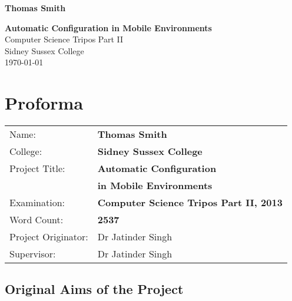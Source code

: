 \documentclass[12pt,twoside,notitlepage]{report}
\begin{document}





\pagestyle{empty}

\hfill{\LARGE \bf Thomas Smith}

\vspace*{60mm}
\begin{center}
\Huge
{\bf Automatic Configuration in Mobile Environments} \\
\vspace*{5mm}
Computer Science Tripos Part II \\
\vspace*{5mm}
Sidney Sussex College \\
\vspace*{5mm}
\today  %
\end{center}

\cleardoublepage


\setcounter{page}{1}
\pagestyle{plain}

\chapter*{Proforma}

{\large
\begin{tabular}{ll}
Name:               & \bf Thomas Smith	\\
College:            & \bf Sidney Sussex College	\\
Project Title:      & \bf Automatic Configuration \\ &\bf in Mobile Environments	\\
Examination:        & \bf Computer Science Tripos Part II, 2013 	\\
Word Count:         & \bf 2537\footnotemark[1] \\
Project Originator: & Dr Jatinder Singh		\\
Supervisor:         & Dr Jatinder Singh		\\ 
\end{tabular}
}



\section*{Original Aims of the Project}
\end{document}

